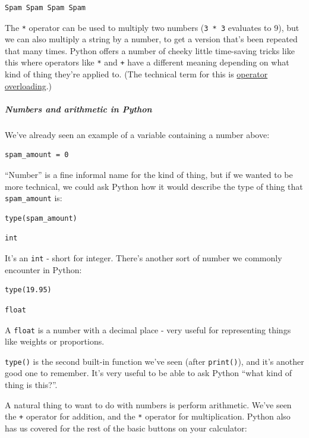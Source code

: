 \begin{verbatim}
Spam Spam Spam Spam
\end{verbatim}

The \texttt{*} operator can be used to multiply two numbers (\texttt{3 * 3} evaluates to 9), but we can also multiply a string by a number, to get a version that's been repeated that many times. Python offers a number of cheeky little time-saving tricks like this where operators like \texttt{*} and \texttt{+} have a different meaning depending on what kind of thing they're applied to. (The technical term for this is \href{https://en.wikipedia.org/wiki/Operator\_overloading}{operator overloading}.)

\subparagraph{Numbers and arithmetic in Python}

We've already seen an example of a variable containing a number above:

\begin{verbatim}
spam_amount = 0
\end{verbatim}

``Number'' is a fine informal name for the kind of thing, but if we wanted to be more technical, we could ask Python how it would describe the type of thing that \texttt{spam\_amount} is:

\begin{verbatim}
type(spam_amount)
\end{verbatim}

\begin{verbatim}
int
\end{verbatim}

It's an \texttt{int} - short for integer. There's another sort of number we commonly encounter in Python:

\begin{verbatim}
type(19.95)
\end{verbatim}

\begin{verbatim}
float
\end{verbatim}

A \texttt{float} is a number with a decimal place - very useful for representing things like weights or proportions.

\texttt{type()} is the second built-in function we've seen (after \texttt{print()}), and it's another good one to remember. It's very useful to be able to ask Python ``what kind of thing is this?''.

A natural thing to want to do with numbers is perform arithmetic. We've seen the \texttt{+} operator for addition, and the \texttt{*} operator for multiplication. Python also has us covered for the rest of the basic buttons on your calculator:


